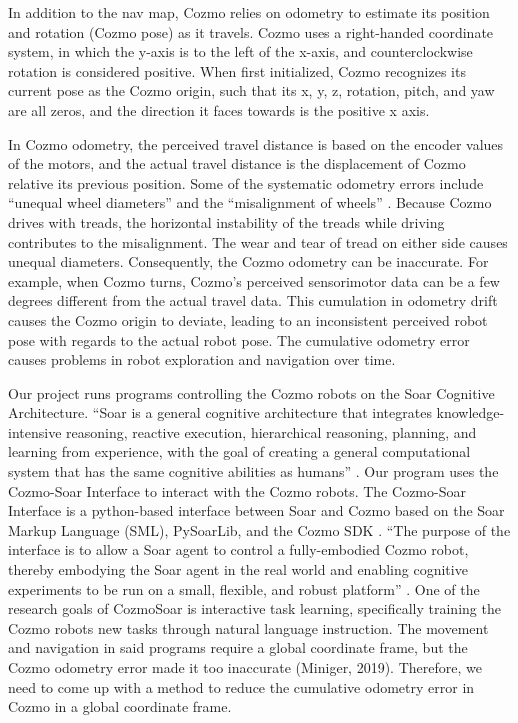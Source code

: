 \documentclass[jou,apacite]{apa6}
\begin{document}
In addition to the nav map, Cozmo relies on odometry to estimate its position and rotation (Cozmo pose) as it travels. Cozmo uses a right-handed coordinate system, in which the y-axis is to the left of the x-axis, and counterclockwise rotation is considered positive. When first initialized, Cozmo recognizes its current pose as the Cozmo origin, such that its x, y, z, rotation, pitch, and yaw are all zeros, and the direction it faces towards is the positive x axis. 

In Cozmo odometry, the perceived travel distance is based on the encoder values of the motors, and the actual travel distance is the displacement of Cozmo relative its previous position. Some of the systematic odometry errors include “unequal wheel diameters” and the “misalignment of wheels” \cite{Borenstein}. Because Cozmo drives with treads, the horizontal instability of the treads while driving contributes to the misalignment. The wear and tear of tread on either side causes unequal diameters. Consequently, the Cozmo odometry can be inaccurate. For example, when Cozmo turns, Cozmo’s perceived sensorimotor data can be a few degrees different from the actual travel data. This cumulation in odometry drift causes the Cozmo origin to deviate, leading to an inconsistent perceived robot pose with regards to the actual robot pose. The cumulative odometry error causes problems in robot exploration and navigation over time.

Our project runs programs controlling the Cozmo robots on the Soar Cognitive Architecture. “Soar is a general cognitive architecture that integrates knowledge-intensive reasoning, reactive execution, hierarchical reasoning, planning, and learning from experience, with the goal of creating a general computational system that has the same cognitive abilities as humans” 
\cite{Laird}. Our program uses the Cozmo-Soar Interface to interact with the Cozmo robots. The Cozmo-Soar Interface is a python-based interface between Soar and Cozmo based on the Soar Markup Language (SML), PySoarLib, and the Cozmo SDK \cite{Mininger}. “The purpose of the interface is to allow a Soar agent to control a fully-embodied Cozmo robot, thereby embodying the Soar agent in the real world and enabling cognitive experiments to be run on a small, flexible, and robust platform” \cite{Boggs}. One of the research goals of CozmoSoar is interactive task learning, specifically training the Cozmo robots new tasks through natural language instruction. The movement and navigation in said programs require a global coordinate frame, but the Cozmo odometry error made it too inaccurate (Miniger, 2019). Therefore, we need to come up with a method to reduce the cumulative odometry error in Cozmo in a global coordinate frame.
\end{document}
